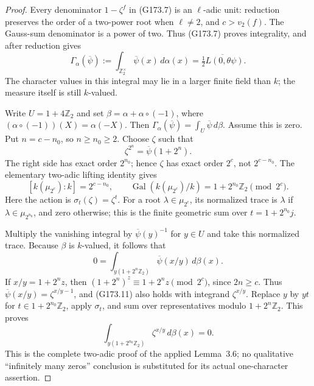 \begin{proof}
Every denominator $1-\zeta^f$ in (G173.7) is an $\ell$-adic unit:
reduction preserves the order of a two-power root when $\ell\ne2$,
and $c>v_2(f)$.  The Gauss-sum denominator is a power of two.
Thus (G173.7) proves integrality, and after reduction gives
\[
 \Gamma_\alpha(\overline\psi)
 :=\int_{\mathbb Z_2^\times}\overline\psi(x)\,d\alpha(x)
             =\overline{\tfrac12L(0,\theta\psi)}.
 \tag{G173.8}
\]
The character values in this integral may lie in a larger finite
field than $k$; the measure itself is still $k$-valued.

Write $U=1+4\mathbb Z_2$ and set $\beta=\alpha+\alpha\circ(-1)$,
where $(\alpha\circ(-1))(X)=\alpha(-X)$.
Then $\Gamma_\alpha(\overline\psi)=\int_U\overline\psi\,d\beta$.
Assume this is zero.  Put $n=c-n_0$, so $n\geq n_0\geq2$.
Choose $\zeta$ such that
\[
       \zeta^{2^n}=\overline\psi(1+2^n).
 \tag{G173.9}
\]
The right side has exact order $2^{n_0}$; hence $\zeta$ has
exact order $2^c$, not $2^{c-n_0}$.
The elementary two-adic lifting identity gives
\[
 [k(\mu_{2^c}):k]=2^{c-n_0},\qquad
 \operatorname{Gal}(k(\mu_{2^c})/k)
          =1+2^{n_0}\mathbb Z_2\pmod {2^c}.
 \tag{G173.10}
\]
Here the action is $\sigma_t(\zeta)=\zeta^t$.
For a root $\lambda\in\mu_{2^c}$, its normalized trace is
$\lambda$ if $\lambda\in\mu_{2^{n_0}}$, and zero otherwise;
this is the finite geometric sum over $t=1+2^{n_0}j$.

Multiply the vanishing integral by $\overline\psi(y)^{-1}$ for
$y\in U$ and take this normalized trace.  Because $\beta$ is
$k$-valued, it follows that
\[
 0=\int_{y(1+2^n\mathbb Z_2)}
                       \overline\psi(x/y)\,d\beta(x).
 \tag{G173.11}
\]
If $x/y=1+2^nz$, then
$(1+2^n)^z\equiv1+2^nz\pmod {2^c}$, since $2n\geq c$.
Thus $\overline\psi(x/y)=\zeta^{x/y-1}$, and (G173.11) also
holds with integrand $\zeta^{x/y}$.
Replace $y$ by $yt$ for $t\in1+2^{n_0}\mathbb Z_2$,
apply $\sigma_t$, and sum over representatives modulo
$1+2^n\mathbb Z_2$.  This proves
\[
 \int_{y(1+2^{n_0}\mathbb Z_2)}\zeta^{x/y}\,d\beta(x)=0.
 \tag{G173.12}
\]
This is the complete two-adic proof of the applied Lemma~3.6;
no qualitative ``infinitely many zeros'' conclusion is substituted
for its actual one-character assertion.


\end{proof}
